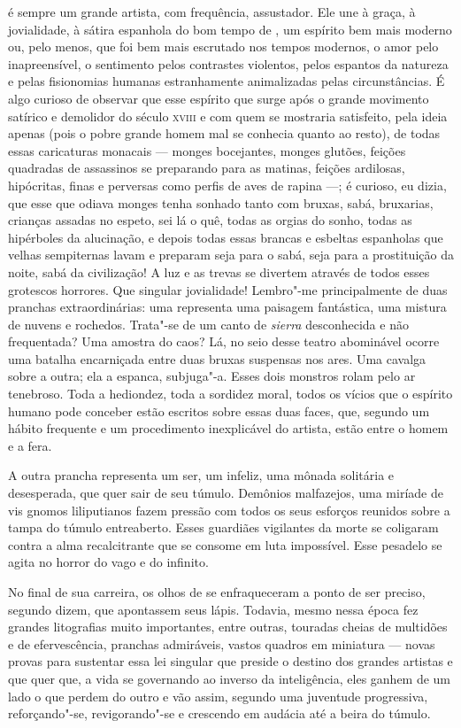  é sempre um grande artista, com frequência, assustador. Ele une à
graça, à jovialidade, à sátira espanhola do bom tempo de , um
espírito bem mais moderno ou, pelo menos, que foi bem mais escrutado
nos tempos modernos, o amor pelo inapreensível, o sentimento pelos
contrastes violentos, pelos espantos da natureza e pelas fisionomias
humanas estranhamente animalizadas pelas circunstâncias. É algo curioso
de observar que esse espírito que surge após o grande movimento
satírico e demolidor do século \textsc{xviii} e com quem  se mostraria
satisfeito, pela ideia apenas (pois o pobre grande homem mal se
conhecia quanto ao resto), de todas essas caricaturas monacais --- monges
bocejantes, monges glutões, feições quadradas de assassinos se
preparando para as matinas, feições ardilosas, hipócritas, finas e
perversas como perfis de aves de rapina ---; é curioso, eu dizia, que
esse que odiava monges tenha sonhado tanto com bruxas, sabá, bruxarias,
crianças assadas no espeto, sei lá o quê, todas as orgias do sonho,
todas as hipérboles da alucinação, e depois todas essas brancas e
esbeltas espanholas que velhas sempiternas lavam e preparam seja para o
sabá, seja para a prostituição da noite, sabá da civilização! A luz e
as trevas se divertem através de todos esses grotescos horrores. Que
singular jovialidade! Lembro"-me principalmente de duas pranchas
extraordinárias: uma representa uma paisagem fantástica, uma mistura de
nuvens e rochedos. Trata"-se de um canto de \textit{sierra} desconhecida e não
frequentada? Uma amostra do caos? Lá, no seio desse teatro abominável
ocorre uma batalha encarniçada entre duas bruxas suspensas nos ares.
Uma cavalga sobre a outra; ela a espanca, subjuga"-a. Esses dois
monstros rolam pelo ar tenebroso. Toda a hediondez, toda a sordidez
moral, todos os vícios que o espírito humano pode conceber estão
escritos sobre essas duas faces, que, segundo um hábito frequente e um
procedimento inexplicável do artista, estão entre o homem e a fera.

A outra prancha representa um ser, um infeliz, uma mônada solitária e
desesperada, que quer sair de seu túmulo. Demônios
malfazejos, uma miríade de vis gnomos liliputianos fazem pressão com
todos os seus esforços reunidos sobre a tampa do túmulo entreaberto.
Esses guardiães vigilantes da morte se coligaram contra a alma
recalcitrante que se consome em luta impossível. Esse pesadelo se
agita no horror do vago e do infinito.

No final de sua carreira, os olhos de  se enfraqueceram a ponto de
ser preciso, segundo dizem, que apontassem seus lápis. Todavia, mesmo
nessa época fez grandes litografias muito importantes, entre outras,
touradas cheias de multidões e de efervescência, pranchas admiráveis,
vastos quadros em miniatura --- novas provas para sustentar essa lei
singular que preside o destino dos grandes artistas e que quer que, a
vida se governando ao inverso da inteligência, eles ganhem de um lado o
que perdem do outro e vão assim, segundo uma juventude progressiva,
reforçando"-se, revigorando"-se e crescendo em audácia até a beira do
túmulo.

